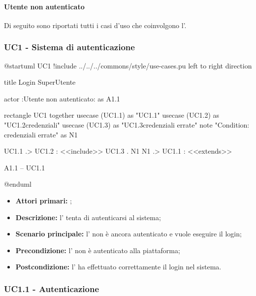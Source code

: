 \documentclass[casi-duso]{subfiles}
\begin{document}
\paragraph{Utente non autenticato}
\label{par:utente-non-autenticato}
Di seguito sono riportati tutti i casi d'uso che coinvolgono l'.

\subsubsection{UC1 - Sistema di autenticazione}
\label{subsub:UC1}


\begin{plantuml}
  @startuml UC1
  !include ../../../commons/style/use-cases.pu
  left to right direction

  title Login SuperUtente

  actor :Utente non autenticato: as A1.1

  rectangle UC1{
      together {
          usecase (UC1.1) as "UC1.1\nAutenticazione"
          usecase (UC1.2) as "UC1.2\nVerifica credenziali"
          usecase (UC1.3) as "UC1.3\nVisualizzazione credenziali errate"
          note "Condition: credenziali errate" as N1
        }
    }

  UC1.1 .> UC1.2 : <<include>>
  UC1.3 . N1
  N1 .> UC1.1 : <<extends>>

  A1.1 -- UC1.1


  @enduml
\end{plantuml}


\begin{itemize}
  \item \textbf{Attori primari:} ;
  \item \textbf{Descrizione:} l' tenta di autenticarsi al sistema;
  \item \textbf{Scenario principale:} l' non è ancora autenticato e vuole eseguire il login;
  \item \textbf{Precondizione:} l' non è autenticato alla piattaforma;
  \item \textbf{Postcondizione:} l' ha effettuato correttamente il login nel sistema.

\end{itemize}
\subsubsection{UC1.1 - Autenticazione}
\label{subsub:UC1.1}
\end{document}
